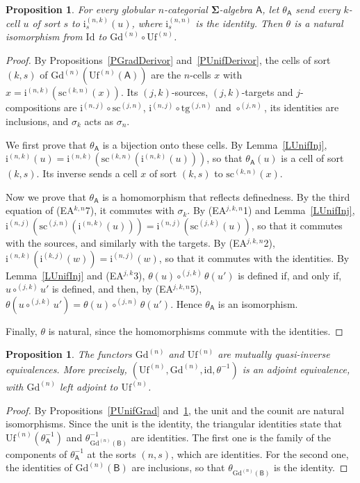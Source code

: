 \documentclass[a4paper,reqno]{amsart}
\newcommand{\sig}[1]{\mathbf{#1}}                %
\newcommand{\calg}[1]{\boldsymbol{\mathsf{#1}}}  %
\newcommand{\id}{\mathrm{id}}
\newcommand{\Id}{\mathrm{Id}}
\newcommand{\src}{\mathrm{sc}}
\newcommand{\tgt}{\mathrm{tg}}
\newcommand{\ii}{\mathrm{i}}
\newcommand{\Gd}{\mathrm{Gd}}
\newcommand{\Uf}{\mathrm{Uf}}
\theoremstyle{plain}
\newtheorem{proposition}[theorem]{Proposition}
\theoremstyle{definition}
\begin{document}
\begin{proposition}\label{PGradUnif}
For every globular $n$-categorial $\sig{\Sigma}$-algebra $\calg{A}$, let $\theta_{\calg{A}}$ send every $k$-cell $u$ of sort $s$ to $\ii^{(n,k)}_{s}(u)$, where $\ii^{(n,n)}_{s}$ is the identity.
Then $\theta$ is a natural isomorphism from $\Id$ to $\Gd^{(n)}\circ\Uf^{(n)}$.
\end{proposition}
\begin{proof}
By Propositions~\ref{PGradDerivor} and~\ref{PUnifDerivor}, the cells of sort $(k,s)$ of $\Gd^{(n)}(\Uf^{(n)}(\calg{A}))$ are the $n$-cells $x$ with $x=\ii^{(n,k)}(\src^{(k,n)}(x))$.
Its $(j,k)$-sources, $(j,k)$-targets and $j$-compositions are $\ii^{(n,j)}\circ\src^{(j,n)}$, $\ii^{(n,j)}\circ\tgt^{(j,n)}$ and $\circ^{(j,n)}$, its identities are inclusions, and $\sigma_{k}$ acts as $\sigma_{n}$.

We first prove that $\theta_{\calg{A}}$ is a bijection onto these cells.
By Lemma~\ref{LUnifInj}, $\ii^{(n,k)}(u)=\ii^{(n,k)}(\src^{(k,n)}(\ii^{(n,k)}(u)))$, so that $\theta_{\calg{A}}(u)$ is a cell of sort $(k,s)$.
Its inverse sends a cell $x$ of sort $(k,s)$ to $\src^{(k,n)}(x)$.

Now we prove that $\theta_{\calg{A}}$ is a homomorphism that reflects definedness.
By the third equation of (EA$^{k,n}$7), it commutes with $\sigma_{k}$.
By (EA$^{j,k,n}$1) and Lemma~\ref{LUnifInj}, $\ii^{(n,j)}(\src^{(j,n)}(\ii^{(n,k)}(u)))=\ii^{(n,j)}(\src^{(j,k)}(u))$, so that it commutes with the sources, and similarly with the targets.
By (EA$^{j,k,n}$2), $\ii^{(n,k)}(\ii^{(k,j)}(w))=\ii^{(n,j)}(w)$, so that it commutes with the identities.
By Lemma~\ref{LUnifInj} and (EA$^{j,k}$3), $\theta(u)\circ^{(j,k)}\theta(u')$ is defined if, and only if, $u\circ^{(j,k)}u'$ is defined, and then, by (EA$^{j,k,n}$5), $\theta(u\circ^{(j,k)}u')=\theta(u)\circ^{(j,n)}\theta(u')$.
Hence $\theta_{\calg{A}}$ is an isomorphism.

Finally, $\theta$ is natural, since the homomorphisms commute with the identities.
\end{proof}

\begin{proposition}\label{PGdUfAdj}
The functors $\Gd^{(n)}$ and $\Uf^{(n)}$ are mutually quasi-inverse equivalences.
More precisely, $(\Uf^{(n)},\Gd^{(n)},\id,\theta^{-1})$ is an adjoint equivalence, with $\Gd^{(n)}$ left adjoint to $\Uf^{(n)}$.
\end{proposition}
\begin{proof}
By Propositions~\ref{PUnifGrad} and~\ref{PGradUnif}, the unit and the counit are natural isomorphisms.
Since the unit is the identity, the triangular identities state that $\Uf^{(n)}(\theta^{-1}_{\calg{A}})$ and $\theta^{-1}_{\Gd^{(n)}(\calg{B})}$ are identities.
The first one is the family of the components of $\theta^{-1}_{\calg{A}}$ at the sorts $(n,s)$, which are identities.
For the second one, the identities of $\Gd^{(n)}(\calg{B})$ are inclusions, so that $\theta_{\Gd^{(n)}(\calg{B})}$ is the identity.
\end{proof}
\end{document}
